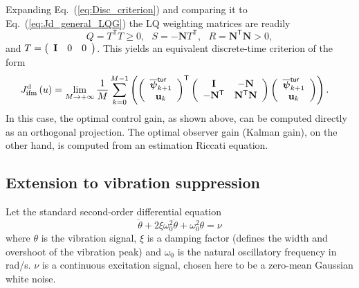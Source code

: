 \documentclass[a4paper,12pt]{article}
\newcommand{\T}{\mathsf{T}} %
\newcommand{\0}{\mathsf{0}} %
\newcommand{\I}{\mathbf{I}} %
\newcommand{\N}{\mathbf{N}} %
\newcommand{\tur}{\mathsf{\tiny{tur}}}
\newcommand{\phivec}{{\boldsymbol{\psi}}}
\newcommand{\uvec}{{\mathbf{u}}}
\begin{document}
      Expanding Eq.~(\ref{eq:Disc_criterion}) and comparing it to
      Eq.~(\ref{eq:Jd_general_LQG}) the LQ weighting matrices are
      readily
      \begin{equation}
        Q = T^{\T}T \geq 0,  ~~~ S = -\N T^{\T},    ~~~ R = \N^{\T}\N
        > 0 ,
      \end{equation}
      and $T = \left(\begin{array}
          [c]{ccccc}%
          \I & 0 &  0
        \end{array}\right)$. This yields an equivalent discrete-time
      criterion of the form
      \begin{align}
        J_\text{ifm}^{\mathrm{d}}\left(u\right) & =\lim_{M\rightarrow+\infty}\frac{1}{M}\sum_{k=0}^{M-1}\left(
          \left( 
            \begin{array}
              [c]{c}%
              \overline{\phivec}_{k+1}^{\tur}\\
              \uvec_{k}%
            \end{array}
          \right)  ^{\T}\left(
            \begin{array}
              [c]{cc}%
              \I & -\N\\
              -\N^{\T} & \N^{\T} \N
            \end{array}
          \right)  
          \left(
            \begin{array}
              [c]{c}%
              \overline{\phivec}_{k+1}^{\tur}\\
              \uvec_{k}%
            \end{array}
          \right)  \right) .
        \label{eq:Disc_criterion_ISI}
      \end{align}
      In this case, the optimal control gain,
      as shown above, can be computed directly as an orthogonal projection.
      The optimal observer gain (Kalman gain), on the other hand, is
      computed from an estimation Riccati equation. %

        \subsection{Extension to vibration suppression}


Let the standard second-order differential equation
\begin{equation}\label{eq:2nd_order_diff_eq}
  \ddot\theta + 2\xi \omega_0^2 \dot \theta + \omega_0^2 \theta = \nu 
\end{equation}
where  $\theta$ is the vibration
signal, $\xi$ is a damping factor (defines the width and overshoot of the vibration
peak) and $\omega_0$ is the natural oscillatory frequency in
rad/s. $\nu$ is a continuous excitation signal, chosen here to be a zero-mean
Gaussian white noise.
\end{document}
